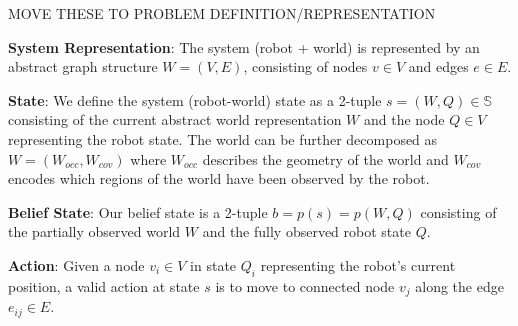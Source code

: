 \documentclass{article}
\newcommand{\ph}[1]{{\textbf{#1}:}} %
\begin{document}



MOVE THESE TO PROBLEM DEFINITION/REPRESENTATION

\ph{System Representation} The system (robot + world) is represented by an abstract graph structure $W = (V, E)$, consisting of nodes $v \in V$ and edges $e \in E$.


\ph{State} We define the system (robot-world) state as a 2-tuple $s = (W, Q) \in \mathbb{S}$ consisting of the current abstract world representation $W$ and the node $Q \in V$ representing the robot state. The world can be further decomposed as $W = (W_{occ}, W_{cov})$ where $W_{occ}$ describes the geometry of the world and $W_{cov}$ encodes which regions of the world have been observed by the robot.   

\ph{Belief State} Our belief state is a 2-tuple $b = p(s) = p(W,Q)$ consisting of the partially observed world $W$ and the fully observed robot state $Q$.

\ph{Action} Given a node $v_i \in V$ in state $Q_i$ representing the robot's current position, a valid action at state $s$ is to move to connected node $v_j$ along the edge $e_{ij} \in E$. 




\end{document}
